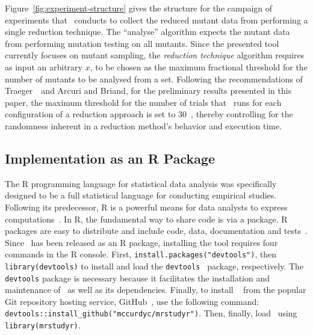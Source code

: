 Figure~\ref{fig:experiment-structure} gives the structure for the campaign of experiments that \mr~conducts to collect
the reduced mutant data from performing a single reduction technique. The ``analyse'' algorithm expects the mutant data
from performing mutation testing on all mutants. Since the presented tool currently focuses on mutant sampling, the
\textit{reduction technique} algorithm requires as input an arbitrary $x$, to be chosen as the maximum fractional threshold
for the number of mutants to be analysed from a set. Following the recommendations of Traeger~\etal~and Arcuri and Briand,
for the preliminary results presented in this paper, the maximum threshold for the number of trials that \mr~runs for each
configuration of a reduction approach is set to 30~\cite{traeger2008nine, arcuri2014hitchhiker}, thereby controlling for
the randomness inherent in a reduction method's behavior and execution time.

\subsection{Implementation as an R Package}

The R programming language for statistical data analysis was specifically designed to be a full statistical language for
conducting empirical studies. Following its predecessor, R is a powerful means for data analysts to express
computations~\cite{ihaka1996r}.  In R, the fundamental way to share code is via a package.  R packages are easy to
distribute and include code, data, documentation and tests~\cite{wickham2015r}.  Since \mr~has been released as an R
package, installing the tool requires four commands in the R console.  First, \texttt{install.packages("devtools")},
then {\small\texttt{library(devtools)}} to install and load the {\small\texttt{devtools}}~\cite{devtools} package,
respectively.  The \texttt{devtools} package is necessary because it facilitates the installation and maintenance of
\mr~as well as its dependencies. Finally, to install \mr~\cite{tool} from the popular Git repository hosting service,
GitHub~\cite{github}, use the following command: {\small\texttt{devtools::install\_github("mccurdyc/mrstudyr")}}.  Then,
finally, load \mr~using \texttt{library(mrstudyr)}.


